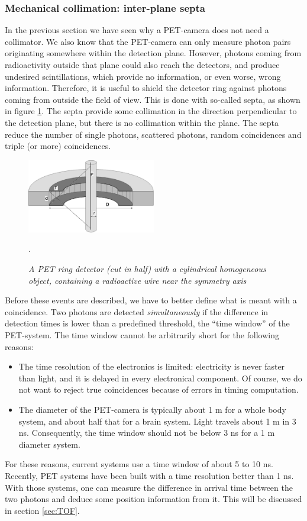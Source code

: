\documentclass[11pt,oneside]{book}
\begin{document}
\subsubsection{Mechanical collimation: inter-plane septa} \label{sec:septa}
In the previous section we have seen why a PET-camera does not need a
collimator. We also know that the PET-camera can only measure photon pairs
originating somewhere within the detection plane. However, photons coming from
radioactivity outside that plane could also reach the detectors, and produce
undesired scintillations, which provide no information, or even worse, wrong
information. Therefore, it is useful to shield the detector ring against
photons coming from outside the field of view. This is done with so-called
septa, as shown in figure \ref{fig:pet_septa}. The septa provide some
collimation in the direction perpendicular to the detection plane, but there is
no collimation within the plane. The septa reduce the number of single
photons, scattered photons, random coincidences and triple (or more)
coincidences.

%
\begin{figure}[tb]
\centering
\includegraphics[width=0.5\textwidth]{figs/fig_pet_septa.pdf}
\caption{\label{fig:pet_septa} \emph{A PET ring detector (cut in half) with a
cylindrical homogeneous object, containing a radioactive wire near the
symmetry axis}}.
\end{figure}

Before these events are described, we have to better define what is meant with
a coincidence. Two photons are detected {\em simultaneously} if the difference
in detection times is lower than a predefined threshold, the ``time window''
of the PET-system. The time window cannot be arbitrarily short for the
following reasons:
\begin{itemize}
  \item The time resolution of the electronics is limited: electricity is
        never faster than light, and it is delayed in every electronical
        component.  Of course, we do not want to reject true coincidences
        because of errors in timing computation.
  \item The diameter of the PET-camera is typically about 1 m for a
        whole body system, and about half that for a brain
        system. Light travels about 1 m in 3 ns. Consequently, the
        time window should not be below 3 ns for a 1 m diameter
        system.
\end{itemize}
For these reasons, current systems use a time window of about 5 to 10
ns. Recently, PET systems have been built with a time resolution
better than 1 ns. With those systems, one can measure the difference
in arrival time between the two photons and deduce some position
information from it. This will be discussed in section \ref{sec:TOF}.
\end{document}
